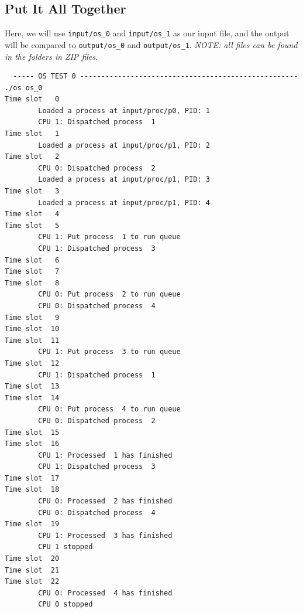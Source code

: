\documentclass[a4paper]{article}
\numberwithin{equation}{section}
\begin{document}
\subsection{Put It All Together}
Here, we will use \texttt{input/os_0} and \texttt{input/os_1} as our input file, and the output will be compared to \texttt{output/os_0} and \texttt{output/os_1}.
\textit{NOTE: all files can be found in the folders in ZIP files.}
\begin{mdframed}[leftline=false,rightline=false,backgroundcolor=grey!10,nobreak=false]
  \begin{verbatim}
  ----- OS TEST 0 ----------------------------------------------------
./os os_0
Time slot   0
        Loaded a process at input/proc/p0, PID: 1
        CPU 1: Dispatched process  1
Time slot   1
        Loaded a process at input/proc/p1, PID: 2
Time slot   2
        CPU 0: Dispatched process  2
        Loaded a process at input/proc/p1, PID: 3
Time slot   3
        Loaded a process at input/proc/p1, PID: 4
Time slot   4
Time slot   5
        CPU 1: Put process  1 to run queue
        CPU 1: Dispatched process  3
Time slot   6
Time slot   7
Time slot   8
        CPU 0: Put process  2 to run queue
        CPU 0: Dispatched process  4
Time slot   9
Time slot  10
Time slot  11
        CPU 1: Put process  3 to run queue
Time slot  12
        CPU 1: Dispatched process  1
Time slot  13
Time slot  14
        CPU 0: Put process  4 to run queue
        CPU 0: Dispatched process  2
Time slot  15
Time slot  16
        CPU 1: Processed  1 has finished
        CPU 1: Dispatched process  3
Time slot  17
Time slot  18
        CPU 0: Processed  2 has finished
        CPU 0: Dispatched process  4
Time slot  19
        CPU 1: Processed  3 has finished
        CPU 1 stopped
Time slot  20
Time slot  21
Time slot  22
        CPU 0: Processed  4 has finished
        CPU 0 stopped


\end{verbatim}
\end{mdframed}
\end{document}
